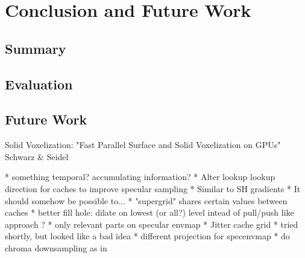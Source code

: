 \documentclass[thesis.tex]{subfiles}
\begin{document}
\chapter{Conclusion and Future Work}\label{chap:concl}

\section{Summary}


\section{Evaluation}


\section{Future Work}

Solid Voxelization: "Fast Parallel Surface and Solid Voxelization on GPUs"  Schwarz \& Seidel 


* something temporal? accumulating information?
* Alter lookup lookup direction for caches to improve specular sampling
  * Similar to SH gradients
  * It should somehow be possible to...
* "supergrid" shares certain values between caches
* better fill hole: dilate on lowest (or all?) level intead of pull/push like approach ?
* only relevant parts on specular envmap
* Jitter cache grid
  * tried shortly, but looked like a bad idea
* different projection for specenvmap
* do chroma downsampling as in \cite{bib:radiancecachechromaticcompression}

\subfilebib %
\end{document}
